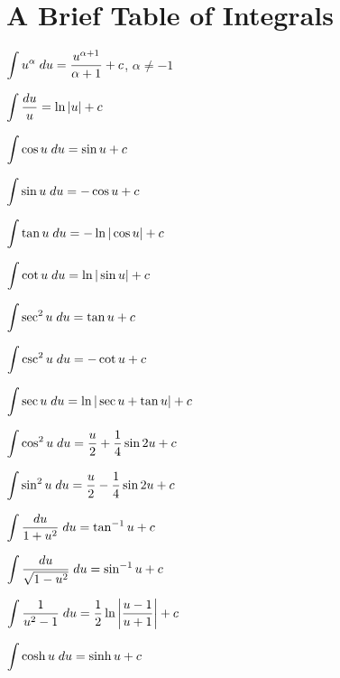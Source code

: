 
\section*[A Brief Table of Integrals]{A Brief Table of Integrals}

\begin{enumext*}[label={},columns=2,itemsep=1.5ex]

\item $\displaystyle\int u^\alpha\; du=\frac{u^{\alpha+1}}{\alpha+1}+c$, \quad
$\alpha\ne-1$

\item $\displaystyle\int\frac{du}{u}=\ln|u|+c$

\item $\displaystyle\int\cos u\;  du=\sin u+c$

\item $\displaystyle\int \sin u\; du=-\cos u+c$

\item $\displaystyle\int \tan u\; du=-\ln|\cos u|+c$

\item $\displaystyle\int \cot u\; du=\ln|\sin u|+c$

\item $\displaystyle\int \sec^2 u\; du=\tan u+c$

\item $\displaystyle\int \csc^2 u\; du=-\cot u+c$

\item $\displaystyle\int \sec u\; du=\ln|\sec u+\tan u|+c$

\item $\displaystyle\int\cos^2 u\; du=\frac{u}{2}+\frac{1}{4}\sin2u+c$

\item $\displaystyle\int\sin^2 u\; du=\frac{u}{2}-\frac{1}{4}\sin2u+c$

\item $\displaystyle\int \frac{du}{1+u^2}\; du=\tan^{-1}u+c$

\item $\displaystyle\int \frac{du}{\sqrt{1-u^2}}\; du=\sin^{-1}u+c$

\item $\displaystyle\int \frac{1}{u^2-1}\; du=\frac{1}{2}\ln\left|\frac{u-1}{u+1}\right|+c$

\item $\displaystyle\int \cosh u\; du=\sinh u+c$


\end{enumext*}

